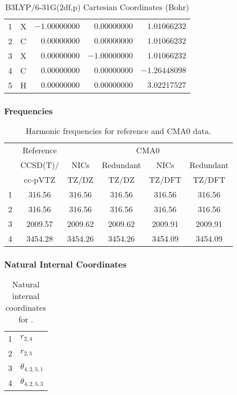 \documentclass[10pt,oneside]{article}
\begin{document}
\begin{table}[h]
\centering
\caption{B3LYP/6-31G(2df,p) Cartesian Coordinates (Bohr)}
\begin{tabular}{llrrr}
\toprule
1  & X  & $-1.00000000$ & $ 0.00000000$ & $ 1.01066232$ \\
2  & C  & $ 0.00000000$ & $ 0.00000000$ & $ 1.01066232$ \\
3  & X  & $ 0.00000000$ & $-1.00000000$ & $ 1.01066232$ \\
4  & C  & $ 0.00000000$ & $ 0.00000000$ & $-1.26448098$ \\
5  & H  & $ 0.00000000$ & $ 0.00000000$ & $ 3.02217527$ \\
\bottomrule
\end{tabular}
\end{table}

\begin{table}[h!]
\subsubsection*{Frequencies}
\centering
\caption{Harmonic frequencies for reference and CMA0 data.}
\begin{tabular}{cccccc}
\toprule
{} & Reference & \multicolumn{4}{c}{CMA0} \\
{} &  CCSD(T)/ &    NICs &  Redundant &    NICs & Redundant \\
{} &   cc-pVTZ &   TZ/DZ &      TZ/DZ &  TZ/DFT &    TZ/DFT \\
\midrule
1 &    316.56 &  316.56 &     316.56 &  316.56 &    316.56 \\
2 &    316.56 &  316.56 &     316.56 &  316.56 &    316.56 \\
3 &   2009.57 & 2009.62 &    2009.62 & 2009.91 &   2009.91 \\
4 &   3454.28 & 3454.26 &    3454.26 & 3454.09 &   3454.09 \\
\bottomrule
\end{tabular}
\end{table}

\begin{table}[h!]
\subsubsection*{Natural Internal Coordinates}
\centering
\caption{Natural internal coordinates for .}
\small
\begin{tabular}{ll}
\toprule
  1   & $r_{2,4}$ \\
  2   & $r_{2,5}$ \\
  3   & $\theta_{4,2,5,1}$ \\
  4   & $\theta_{4,2,5,3}$ \\
\bottomrule
\end{tabular}
\end{table}
\end{document}
